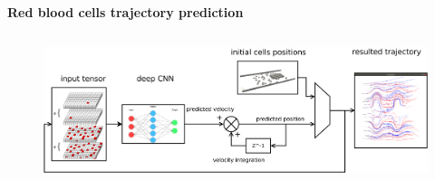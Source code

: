 \documentclass[xcolor=dvipsnames]{beamer}
\begin{document}
\begin{frame}{\bf Red blood cells trajectory prediction}
\begin{columns}
\begin{column}{0.5\textwidth}


        \end{column}

    \end{columns}


    \begin{figure}
      \includegraphics[scale=0.12]{../../diagrams/cells_prediction_velocity_integration.png}
    \end{figure}


\end{frame}
\end{document}
